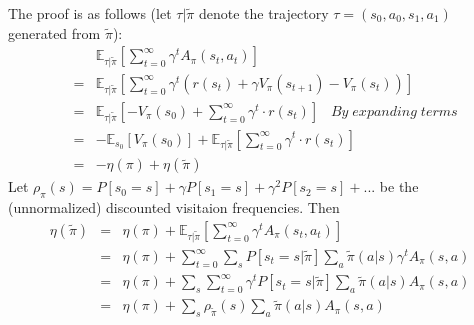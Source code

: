 \documentclass{article}
\begin{document}
The proof is as follows (let $\tau|\tilde{\pi}$ denote the trajectory $\tau = (s_{0},a_{0},s_{1},a_{1})$ generated from $\tilde{\pi}$):\begin{eqnarray}
&&\mathbb{E}_{\tau|\tilde{\pi}}\left[\sum_{t=0}^{\infty}\gamma^{t}A_{\pi}(s_{t},a_{t})\right] \\
&=& \mathbb{E}_{\tau|\tilde{\pi}}\left[\sum_{t=0}^{\infty}\gamma^{t} (r(s_{t}) +\gamma V_{\pi}(s_{t+1})-V_{\pi}(s_{t}))\right]\\
&=& \mathbb{E}_{\tau|\tilde{\pi}}\left[-V_{\pi}(s_{0})+\sum_{t=0}^{\infty}\gamma^{t}\cdot r(s_{t})\right]\;\;\;By\;expanding\;terms\\
&=& -\mathbb{E}_{s_{0}}\left[V_{\pi}(s_{0})\right] 
 + \mathbb{E}_{\tau|\tilde{\pi}}\left[\sum_{t=0}^{\infty}\gamma^{t}\cdot r(s_{t})\right]\\
&=& -\eta(\pi) + \eta(\tilde{\pi})
\end{eqnarray}
Let $\rho_{\pi}(s)=P[s_{0}=s]+\gamma P[s_{1}=s]+\gamma^{2} P[s_{2}=s]+...$ be the (unnormalized) discounted visitaion frequencies. Then\begin{eqnarray}
\eta(\tilde{\pi}) &=& \eta(\pi) +\mathbb{E}_{\tau|\tilde{\pi}}\left[\sum_{t=0}^{\infty}\gamma^{t}A_{\pi}(s_{t},a_{t})\right]\\
&=& \eta(\pi) + \sum_{t=0}^{\infty}\sum_{s}P[s_{t}=s|\tilde{\pi}]\sum_{a}\tilde{\pi}(a|s)\gamma^{t}A_{\pi}(s,a)\\
&=& \eta(\pi) + \sum_{s}\sum_{t=0}^{\infty}\gamma^{t}P[s_{t}=s|\tilde{\pi}]\sum_{a}\tilde{\pi}(a|s)A_{\pi}(s,a)\\
&=& \eta(\pi) + \sum_{s}\rho_{\tilde{\pi}}(s)\sum_{a}\tilde{\pi}(a|s)A_{\pi}(s,a)
\end{eqnarray}\\
\end{document}
